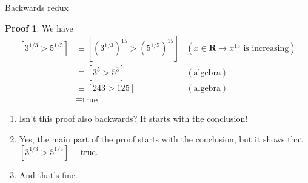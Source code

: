 \documentclass[fleqn]{beamer}
\newcommand{\reals}{\mathbf{R}}
\theoremstyle{definition}
\newtheorem{myproof}{Proof}
\begin{document}
\begin{frame}{Backwards redux}

\begin{myproof}
We have
\begin{align*}
   \left[   3^{1/3} > 5^{1/5} \right]  &\equiv \left[   (3^{1/3})^{15} > (5^{1/5})^{15}  \right]    & ( x \in \reals \mapsto x^{15} \mbox{ is  increasing}) \\
                                                               &\equiv  \left[ 3^5> 5^3 \right]   &(\mbox{algebra}) \\
                                                                   &\equiv  \left[ 243 > 125 \right]   &(\mbox{algebra}) \\
                                                                   &\equiv  \mbox{true}
  \end{align*}
\end{myproof}
\begin{enumerate}

\item Isn't this proof also backwards? It starts with the conclusion!

\item Yes, the main part of the proof starts with the conclusion, but it shows that   \(    \left[   3^{1/3} > 5^{1/5} \right]    \equiv  \mbox{true} \).

\item And that's fine.
\end{enumerate}
\end{frame}
\end{document}
